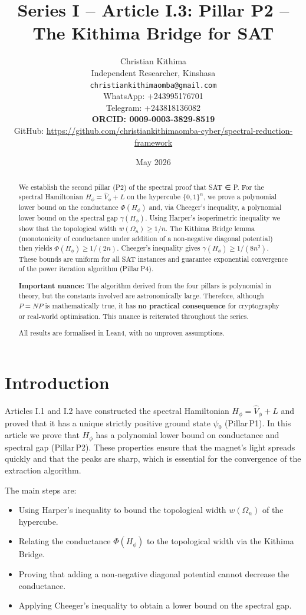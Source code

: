 \documentclass[11pt,a4paper]{article}
\title{Series I – Article I.3: Pillar P2 – The Kithima Bridge for SAT}
\author{Christian Kithima \\
Independent Researcher, Kinshasa \\
\texttt{christiankithimaomba@gmail.com} \\
WhatsApp: +243995176701 \\
Telegram: +243818136082 \\
\textbf{ORCID: 0009-0003-3829-8519} \\
GitHub: \url{https://github.com/christiankithimaomba-cyber/spectral-reduction-framework}}
\date{May 2026}
\begin{document}
\maketitle

\begin{abstract}
We establish the second pillar (P2) of the spectral proof that SAT ∈ P. For the spectral Hamiltonian $H_\phi = \hat{V}_\phi + L$ on the hypercube $\{0,1\}^n$, we prove a polynomial lower bound on the conductance $\Phi(H_\phi)$ and, via Cheeger's inequality, a polynomial lower bound on the spectral gap $\gamma(H_\phi)$. Using Harper's isoperimetric inequality we show that the topological width $w(\Omega_n) \ge 1/n$. The Kithima Bridge lemma (monotonicity of conductance under addition of a non‑negative diagonal potential) then yields $\Phi(H_\phi) \ge 1/(2n)$. Cheeger's inequality gives $\gamma(H_\phi) \ge 1/(8n^2)$. These bounds are uniform for all SAT instances and guarantee exponential convergence of the power iteration algorithm (Pillar P4).

\textbf{Important nuance:} The algorithm derived from the four pillars is polynomial in theory, but the constants involved are astronomically large. Therefore, although $P = NP$ is mathematically true, it has \textbf{no practical consequence} for cryptography or real‑world optimisation. This nuance is reiterated throughout the series.

All results are formalised in Lean4, with no unproven assumptions.
\end{abstract}

\tableofcontents

\section{Introduction}

Articles I.1 and I.2 have constructed the spectral Hamiltonian $H_\phi = \hat{V}_\phi + L$ and proved that it has a unique strictly positive ground state $\psi_0$ (Pillar P1). In this article we prove that $H_\phi$ has a polynomial lower bound on conductance and spectral gap (Pillar P2). These properties ensure that the magnet's light spreads quickly and that the peaks are sharp, which is essential for the convergence of the extraction algorithm.

The main steps are:
\begin{itemize}
\item Using Harper's inequality to bound the topological width $w(\Omega_n)$ of the hypercube.
\item Relating the conductance $\Phi(H_\phi)$ to the topological width via the Kithima Bridge.
\item Proving that adding a non‑negative diagonal potential cannot decrease the conductance.
\item Applying Cheeger's inequality to obtain a lower bound on the spectral gap.
\end{itemize}
\end{document}

